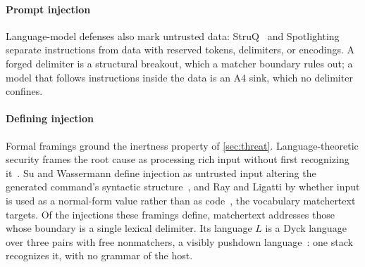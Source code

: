 \paragraph{Prompt injection}
Language-model defenses also mark untrusted data: StruQ~\cite{chen25struq} and
Spotlighting~\cite{hines24spotlighting} separate instructions from data with
reserved tokens, delimiters, or encodings. A forged delimiter is a structural
breakout, which a matcher boundary rules out; a model that follows instructions
inside the data is an A4 sink, which no delimiter confines.

\paragraph{Defining injection}
Formal framings ground the inertness property of \cref{sec:threat}.
Language-theoretic security frames the root cause as processing rich input
without first recognizing it~\cite{momot16langsec}. Su and Wassermann define
injection as untrusted input altering the generated command's syntactic
structure~\cite{su06essence}, and Ray and Ligatti by whether input is used as a
normal-form value rather than as code~\cite{ray12defining}, the vocabulary
matchertext targets. Of the injections these framings define, matchertext
addresses those whose boundary is a single lexical delimiter. Its language $L$ is a Dyck language
over three pairs with free nonmatchers, a visibly pushdown
language~\cite{alur04vpl}: one stack recognizes it, with no grammar of the host.
